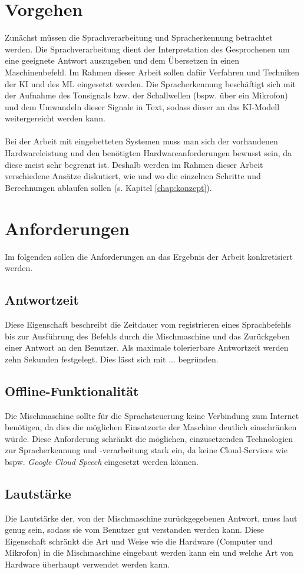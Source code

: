 \section{Vorgehen}
Zunächst müssen die Sprachverarbeitung und Spracherkennung betrachtet werden. Die Sprachverarbeitung dient der Interpretation des Gesprochenen um eine geeignete Antwort auszugeben und dem Übersetzen in einen Maschinenbefehl. Im Rahmen dieser Arbeit sollen dafür Verfahren und Techniken der \ac{KI} und des \ac{ML} eingesetzt werden. Die Spracherkennung beschäftigt sich mit der Aufnahme des Tonsignals bzw. der Schallwellen (bspw. über ein Mikrofon) und dem Umwandeln dieser Signale in Text, sodass dieser an das \ac{KI}-Modell weitergereicht werden kann.\\\\
Bei der Arbeit mit eingebetteten Systemen muss man sich der vorhandenen Hardwareleistung und den benötigten Hardwareanforderungen bewusst sein, da diese meist sehr begrenzt ist. Deshalb werden im Rahmen dieser Arbeit verschiedene Ansätze diskutiert, wie und wo die einzelnen Schritte und Berechnungen ablaufen sollen (s. Kapitel \ref{chap:konzept}).

\section{Anforderungen}
Im folgenden sollen die Anforderungen an das Ergebnis der Arbeit konkretisiert werden.
\subsection{Antwortzeit}
Diese Eigenschaft beschreibt die Zeitdauer vom registrieren eines Sprachbefehls bis zur Ausführung des Befehls durch die Mischmaschine und das Zurückgeben einer Antwort an den Benutzer.  Als maximale tolerierbare Antwortzeit werden zehn Sekunden festgelegt. Dies lässt sich mit ... begründen.
\subsection{Offline-Funktionalität}
Die Mischmaschine sollte für die Sprachsteuerung keine Verbindung zum Internet benötigen, da dies die möglichen Einsatzorte der Maschine deutlich einschränken würde.  Diese Anforderung schränkt die möglichen, einzusetzenden Technologien zur Spracherkennung und -verarbeitung stark ein, da keine Cloud-Services wie bspw. \textit{Google Cloud Speech} eingesetzt werden können.
\subsection{Lautstärke}
Die Lautstärke der, von der Mischmaschine zurückgegebenen Antwort, muss laut genug sein, sodass sie vom Benutzer gut verstanden werden kann. Diese Eigenschaft schränkt die Art und Weise wie die Hardware (Computer und Mikrofon) in die Mischmaschine eingebaut werden kann ein und welche Art von Hardware überhaupt verwendet werden kann.
